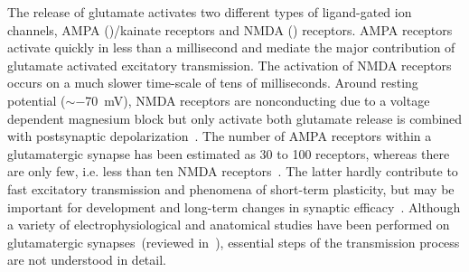 The release of glutamate activates two different types of
ligand-gated ion channels, AMPA (\ampa)/kainate receptors and NMDA
(\nmda) receptors.  AMPA receptors activate quickly in less than a
millisecond and mediate the major contribution of glutamate activated
excitatory transmission.  The activation of NMDA receptors occurs on
a much slower time-scale of tens of milliseconds.  Around resting
potential ($\sim -$70~mV), NMDA receptors are nonconducting due to a
voltage dependent magnesium block but only activate both glutamate
release is combined with postsynaptic depolarization~\cite{Kzm97}.
The number of AMPA receptors within a glutamatergic synapse has been
estimated as 30 to 100 receptors, whereas there are only few, i.e. 
less than ten NMDA receptors~\cite{Edw95, Spt95}. The latter hardly
contribute to fast excitatory transmission and phenomena of
short-term plasticity, but may be important for development and
long-term changes in synaptic efficacy~\cite{Kzm97, Mar98}.  Although
a variety of electrophysiological and anatomical studies have been
performed on glutamatergic synapses~(reviewed in~\cite{Edw95a,
Wls98}), essential steps of the transmission process are not
understood in detail. \\






